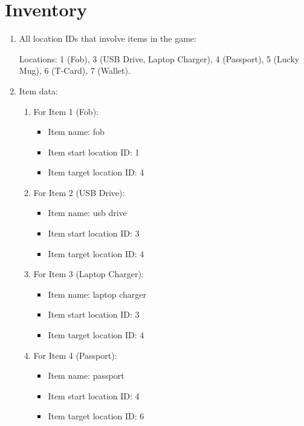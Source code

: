 \documentclass[11pt]{article}
\begin{document}
\section*{Inventory}
\begin{enumerate}
    \item All location IDs that involve items in the game: 
    
    Locations: 1 (Fob), 3 (USB Drive, Laptop Charger), 4 (Passport), 5 (Lucky Mug), 6 (T-Card), 7 (Wallet).
    
    \item Item data:
    \begin{enumerate}
        \item For Item 1 (Fob):
        \begin{itemize}
            \item Item name: fob
            \item Item start location ID: 1
            \item Item target location ID: 4
        \end{itemize}
        
        \item For Item 2 (USB Drive):
        \begin{itemize}
            \item Item name: usb drive
            \item Item start location ID: 3
            \item Item target location ID: 4
        \end{itemize}
        
        \item For Item 3 (Laptop Charger):
        \begin{itemize}
            \item Item name: laptop charger
            \item Item start location ID: 3
            \item Item target location ID: 4
        \end{itemize}
        
        \item For Item 4 (Passport):
        \begin{itemize}
            \item Item name: passport
            \item Item start location ID: 4
            \item Item target location ID: 6
        \end{itemize}
        

\end{enumerate}
\end{enumerate}
\end{document}
